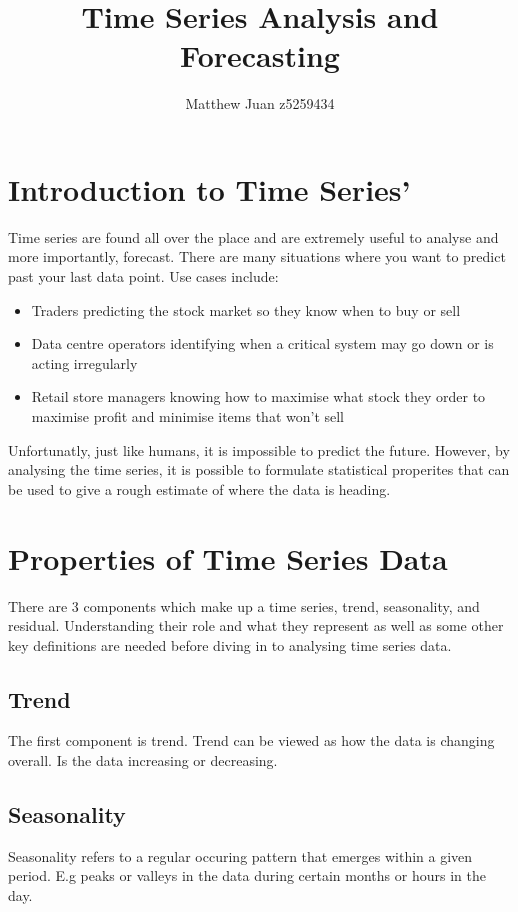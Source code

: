 \documentclass{article}
\title{Time Series Analysis and Forecasting}
\author{Matthew Juan z5259434}
\date{}
\begin{document}
  \maketitle

  \newpage
  \doublespacing
  \tableofcontents
  \singlespacing
  \newpage
  \section{Introduction to Time Series'}
  Time series are found all over the place and are extremely useful
  to analyse and more importantly, forecast. There are many situations where
  you want to predict past your last data point.
  Use cases include:
  \begin{itemize}
    \item Traders predicting the stock market so they know when to buy or sell
    \item Data centre operators identifying when a critical system may go down or is acting irregularly
    \item Retail store managers knowing how to maximise what stock they order to maximise profit and minimise items that won't sell
  \end{itemize}
  Unfortunatly, just like humans, it is impossible to predict the future.
  However, by analysing the time series, it is possible to formulate
  statistical properites that can be used to give a rough estimate of
  where the data is heading.
  \newpage
  \section{Properties of Time Series Data}
  There are 3 components which make up a time series, trend, seasonality, and residual. Understanding their role and what they represent as well as some other key definitions are needed before diving in to analysing time series data.
  
  \subsection{Trend}
  The first component is trend. Trend can be viewed as how the data is changing overall. Is the data increasing or decreasing.
  
  \subsection{Seasonality}
  Seasonality refers to a regular occuring pattern that emerges within a given period. E.g peaks or valleys in the data during certain months or hours in the day.
  
\end{document}
